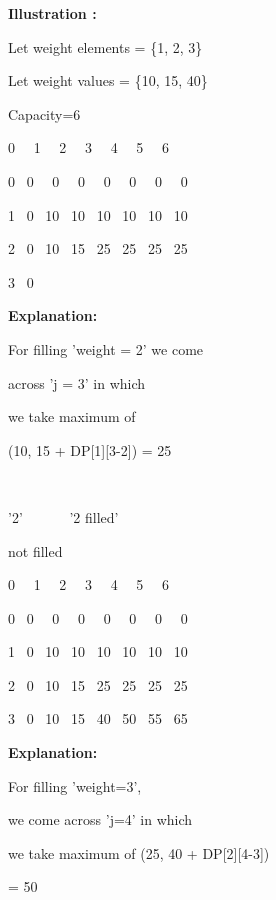 \documentclass[letterpaper]{article}
\begin{document}
\begin{multicols}{2}

\bigskip
{\bfseries
Illustration :}

Let weight elements = \{1, 2, 3\}

Let weight values = \{10, 15, 40\}

Capacity=6


\bigskip

0 \ \ 1 \ \ 2 \ \ 3 \ \ 4 \ \ 5 \ \ 6


\bigskip

0 \ 0 \ \ 0 \ \ 0 \ \ 0 \ \ 0 \ \ 0 \ \ 0


\bigskip

1 \ 0 \ 10 \ 10 \ 10 \ 10 \ 10 \ 10


\bigskip

2 \ 0 \ 10 \ 15 \ 25 \ 25 \ 25 \ 25


\bigskip

3 \ 0


\bigskip

{\bfseries
Explanation:}

For filling 'weight = 2' we come 

across 'j = 3' in which 

we take maximum of 

(10, 15 + DP[1][3-2]) = 25 \ \ 

\ \ {\textbar} \ \ \ \ \ \ \ {\textbar}

{}'2' \ \ \ \ \ \ {}'2 filled'

not filled \ 


\bigskip

0 \ \ 1 \ \ 2 \ \ 3 \ \ 4 \ \ 5 \ \ 6


\bigskip

0 \ 0 \ \ 0 \ \ 0 \ \ 0 \ \ 0 \ \ 0 \ \ 0


\bigskip

1 \ 0 \ 10 \ 10 \ 10 \ 10 \ 10 \ 10


\bigskip

2 \ 0 \ 10 \ 15 \ 25 \ 25 \ 25 \ 25


\bigskip

3 \ 0 \ 10 \ 15 \ 40 \ 50 \ 55 \ 65


\bigskip

{\bfseries
Explanation:}

For filling 'weight=3', 

we come across 'j=4' in which 

we take maximum of (25, 40 + DP[2][4-3]) 

= 50



\end{multicols}
\end{document}
